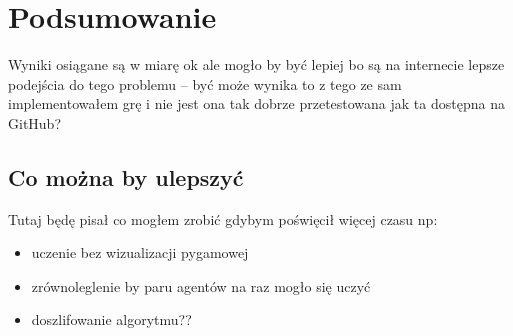 \documentclass[a4paper,12pt,oneside]{book}
\begin{document}
\chapter{Podsumowanie}
Wyniki osiągane są w miarę ok ale mogło by być lepiej bo są na internecie lepsze
podejścia do tego problemu -- być może wynika to z tego ze sam implementowałem grę
i nie jest ona tak dobrze przetestowana jak ta dostępna na GitHub?
\section{Co można by ulepszyć}
Tutaj będę pisał co mogłem zrobić gdybym poświęcił więcej czasu np:
\begin{itemize}
\item uczenie bez wizualizacji pygamowej
\item zrównoleglenie by paru agentów na raz mogło się uczyć
\item doszlifowanie algorytmu??
\end{itemize}




\end{document}
